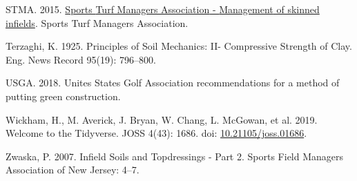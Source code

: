 \documentclass[
  letterpaper,
]{article}
\newlength{\cslhangindent}
\newlength{\cslentryspacingunit} %
\newenvironment{CSLReferences}[2] %
 {%
  \setlength{\parindent}{0pt}
  \ifodd #1
  \let\oldpar\par
  \def\par{\hangindent=\cslhangindent\oldpar}
  \fi
  \setlength{\parskip}{#2\cslentryspacingunit}
 }%
 {}
\begin{document}
\begin{CSLReferences}{1}{0}
\leavevmode{}%
STMA. 2015. \href{https://www.stma.org/wp-content/uploads/2017/11/65d68a00-150d-457e-8708-dcb12717eecc.pdf}{Sports {Turf Managers Association} - {Management} of skinned infields}. {Sports Turf Managers Association}.

\leavevmode{}%
Terzaghi, K. 1925. Principles of {Soil Mechanics}: {II- Compressive Strength} of {Clay}. Eng. News Record 95(19): 796--800.

\leavevmode{}%
USGA. 2018. Unites {States Golf Association} recommendations for a method of putting green construction.

\leavevmode{}%
Wickham, H., M. Averick, J. Bryan, W. Chang, L. McGowan, et al. 2019. Welcome to the {Tidyverse}. JOSS 4(43): 1686. doi: \href{https://doi.org/10.21105/joss.01686}{10.21105/joss.01686}.

\leavevmode{}%
Zwaska, P. 2007. Infield {Soils} and {Topdressings} - {Part} 2. Sports Field Managers Association of New Jersey: 4--7.

\end{CSLReferences}
\end{document}
